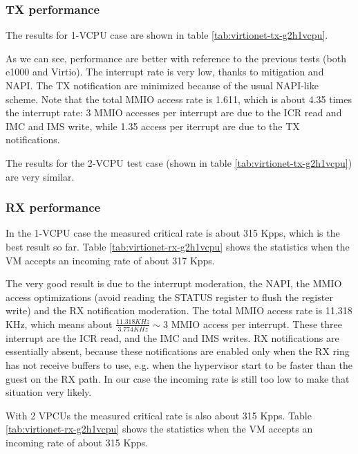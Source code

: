 \subsubsection{TX performance}
The results for 1-VCPU case are shown in table \ref{tab:virtionet-tx-g2h1vcpu}.

As we can see, performance are better with reference to the previous tests (both e1000 and Virtio). The interrupt rate is very low,
thanks to mitigation and NAPI. The TX notification are minimized because of the usual NAPI-like scheme.
Note that the total MMIO access rate is 1.611, which is about 4.35 times the interrupt rate: 3 MMIO accesses per interrupt are due
to the ICR read and IMC and IMS write, while 1.35 access per iterrupt are due to the TX notifications.

\vspace{0.5cm}

The results for the 2-VCPU test case (shown in table \ref{tab:virtionet-tx-g2h1vcpu}) are very similar.



\subsubsection{RX performance}
In the 1-VCPU case the measured critical rate is about 315 Kpps, which is the best result so far. Table \ref{tab:virtionet-rx-g2h1vcpu}
shows the statistics when the VM accepts an incoming rate of about 317 Kpps.

The very good result is due to the interrupt moderation, the NAPI, the MMIO access optimizations (avoid reading the STATUS register to
flush the register write) and the RX notification moderation.
The total MMIO access rate is 11.318 KHz, which means about $\frac{11.318 KHz}{3.774 KHz} \sim 3$ MMIO access per interrupt. These three
interrupt are the ICR read, and the IMC and IMS writes. RX notifications are essentially absent, because these notifications are enabled
only when the RX ring has not receive buffers to use, e.g. when the hypervisor start to be faster than the guest on the RX path.
In our case the incoming rate is still too low to make that situation very likely.

\vspace{0.5cm}

With 2 VPCUs the measured critical rate is also about 315 Kpps. Table \ref{tab:virtionet-rx-g2h1vcpu}
shows the statistics when the VM accepts an incoming rate of about 315 Kpps.

